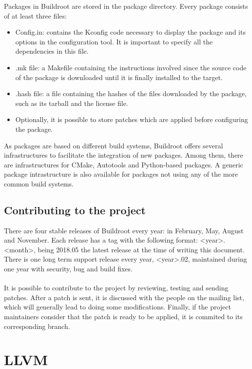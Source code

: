\documentclass[12pt,a4paper,oneside]{article}
\begin{document}
Packages in Buildroot are stored in the {\selectfont package}
directory. Every package consists of at least three files:
\begin{itemize}
  \item Config.in: contains the Kconfig code necessary to display the package
  and its options in the configuration tool. It is important to specify all
  the dependencies in this file.
  \item .mk file: a Makefile containing the instructions involved since the
  source code of the package is downloaded until it is finally installed to the
  target.
  \item .hash file: a file containing the hashes of the files downloaded by the
  package, such as its tarball and the license file.
  \item Optionally, it is possible to store patches which are applied before
  configuring the package.
\end{itemize}
As packages are based on different build systems, Buildroot offers several
infrastructures to facilitate the integration of new packages. Among them, there
are infrastructures for CMake, Autotools and Python-based packages. A generic
package intrastructure is also available for packages not using any of the more
common build systems.

\subsection{Contributing to the project}

There are four stable releases of Buildroot every year: in February, May, August
and November. Each release has a tag with the following format:
\textless year\textgreater.\textless month\textgreater, being 2018.05 the latest
release at the time of writing this document. There is one long term support
release every year, \textless year\textgreater.02, maintained during one year
with security, bug and build fixes.\\\\
It is possible to contribute to the project by reviewing, testing and sending
patches. After a patch is sent, it is discussed with the people on the mailing
list, which will generally lead to doing some modifications. Finally, if the
project maintainers consider that the patch is ready to be applied, it is
commited to its corresponding branch.

\newpage
\section{LLVM}
\end{document}
